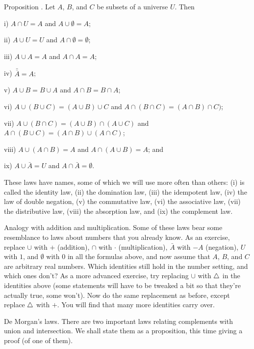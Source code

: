 \edef\propsetlaws{\the\thmcount}
\proclaim Proposition \advthm. Let $A$, $B$, and $C$ be subsets of a universe $U$. Then
\medskip
\item{i)} $A\cap U = A$ and $A\cup \emptyset = A$;
\smallskip
\item{ii)} $A\cup U = U$ and $A\cap \emptyset = \emptyset$;
\smallskip
\item{iii)} $A\cup A = A$ and $A\cap A = A$;
\smallskip
\item{iv)} $\bar{\bar A} = A$;
\smallskip
\item{v)} $A\cup B = B\cup A$ and $A\cap B = B\cap A$;
\smallskip
\item{vi)} $A\cup (B\cup C) = (A\cup B) \cup C$ and $A\cap (B\cap C) = (A\cap B)\cap C)$;
\smallskip
\item{vii)} $A\cup (B\cap C) = (A\cup B) \cap (A\cup C)$ and $A\cap (B\cup C) = (A\cap B)\cup (A\cap C)$;
\smallskip
\item{viii)} $A\cup (A\cap B) = A$ and $A\cap (A\cup B) = A$; and
\smallskip
\item{ix)} $A\cup \bar A = U$ and $A\cap \bar A = \emptyset$.\slug
\medskip

These laws have names, some of which we will use more often than others:
(i) is called the identity law, (ii) the domination law, (iii) the idempotent law,
(iv) the law of double negation, (v) the commutative law, (vi) the associative law,
(vii) the distributive law, (viii) the absorption law, and (ix) the complement law.

\medskip\boldlabel \llap{*}Analogy with addition and multiplication.
Some of these laws bear some resemblance to laws about numbers that you already know. As an exercise,
replace $\cup$ with $+$ (addition), $\cap$ with $\cdot$ (multiplication), $\bar A$ with $-A$ (negation),
$U$ with $1$, and $\emptyset$ with $0$ in all the formulas
above, and now assume that $A$, $B$, and $C$ are arbitrary real numbers. Which identities still hold in
the number setting, and which ones don't? As a more advanced exercise, try replacing $\cup$
with $\mathrel{\triangle}$ in the identities above (some statements will have to be tweaked a bit so that they're
actually true, some won't). Now do the same
replacement as before, except replace $\mathrel{\triangle}$ with $+$. You will find that many more identities
carry over.

\medskip\boldlabel{} De Morgan's laws.
There are two important laws relating complements with union and intersection.
We shall state them as a proposition, this time giving a proof (of one of them).

